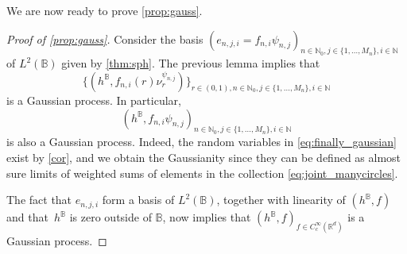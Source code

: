 \documentclass[JEP,XML,SOM,Unicode,published]{cedram}
\theoremstyle{definition}
\newcommand{\R}{\mathbb{R}}
\newcommand{\N}{\mathbb{N}}
\newcommand{\B}{\mathbb{B}}\let\D\B\let\Ub\B
\begin{document}
{We are now ready to prove \cref{prop:gauss}.}

\begin{proof}[Proof of \cref{prop:gauss}]

Consider the basis {$(e_{n,j,i} = f_{n,i}\psi_{n,j})_{n \in \N_0, j \in \{1, \dots, M_n\},i \in \N}$} of $L^2(\B)$ given by \cref{thm:sph}. The previous lemma implies that\vspace*{-3pt}
\begin{equation}\label{eq:joint_manycircles}
\{(h^\B, f_{n,i}(r)\nu_r^{\psi_{n,j}})\}_{r \in (0,1), n \in \N_0, j \in \{1, \dots, M_n\}, i \in \N}
\end{equation}
is a Gaussian process. In particular,\vspace*{-3pt}
\begin{equation}\label{eq:finally_gaussian}
{(h^\B,f_{n,i}\psi_{n,j})_{n \in \N_0, j \in \{1, \dots, M_n\}, i \in \N}}
\end{equation}
is also a Gaussian process. Indeed, the random variables in \eqref{eq:finally_gaussian} exist by \cref{cor}, and we obtain the Gaussianity since they can be defined as almost sure limits of weighted sums of elements in the collection \eqref{eq:joint_manycircles}.

The fact that $e_{n,j,i}$ form a basis of $L^2(\B)$, together with linearity of $(h^\B, f)$ and that~$h^\B$ is zero outside of $\B$, now implies that $(h^\B,f)_{f \in C_c^\infty(\R^d)}$ is a Gaussian process.
\end{proof}




\end{document}
